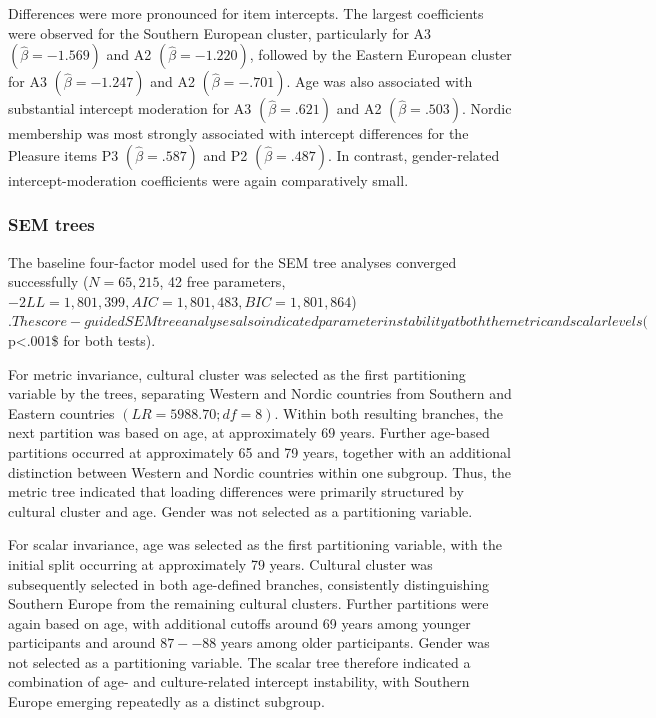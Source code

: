 \documentclass[
  man,
  floatsintext]{apa7}
\begin{document}
Differences were more pronounced for item intercepts. The largest
coefficients were observed for the Southern European cluster,
particularly for A3 \((\hat\beta=-1.569)\) and A2
\((\hat\beta=-1.220)\), followed by the Eastern European cluster for A3
\((\hat\beta=-1.247)\) and A2 \((\hat\beta=-.701)\). Age was also
associated with substantial intercept moderation for A3
\((\hat\beta=.621)\) and A2 \((\hat\beta=.503)\). Nordic membership was
most strongly associated with intercept differences for the Pleasure
items P3 \((\hat\beta=.587)\) and P2 \((\hat\beta=.487)\). In contrast,
gender-related intercept-moderation coefficients were again
comparatively small.

\subsubsection{SEM trees}\label{sem-trees}

The baseline four-factor model used for the SEM tree analyses converged
successfully (\(N=65{,}215\), 42 free parameters,
\(-2LL=1{,}801{,}399, AIC =1{,}801{,}483, BIC =1{,}801{,}864\))\(.
The score-guided SEM tree analyses also indicated parameter instability at both the metric and scalar levels (\)p\textless.001\$
for both tests).

For metric invariance, cultural cluster was selected as the first
partitioning variable by the trees, separating Western and Nordic
countries from Southern and Eastern countries \((LR=5988.70; df=8)\).
Within both resulting branches, the next partition was based on age, at
approximately 69 years. Further age-based partitions occurred at
approximately 65 and 79 years, together with an additional distinction
between Western and Nordic countries within one subgroup. Thus, the
metric tree indicated that loading differences were primarily structured
by cultural cluster and age. Gender was not selected as a partitioning
variable.

For scalar invariance, age was selected as the first partitioning
variable, with the initial split occurring at approximately 79 years.
Cultural cluster was subsequently selected in both age-defined branches,
consistently distinguishing Southern Europe from the remaining cultural
clusters. Further partitions were again based on age, with additional
cutoffs around 69 years among younger participants and around \(87--88\)
years among older participants. Gender was not selected as a
partitioning variable. The scalar tree therefore indicated a combination
of age- and culture-related intercept instability, with Southern Europe
emerging repeatedly as a distinct subgroup.
\end{document}
